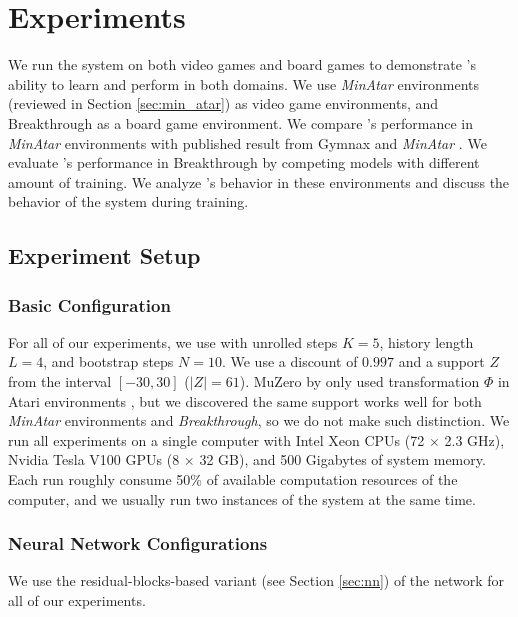 \chapter{Experiments}
\label{sec:exp}
We run the \moozi system on both video games and board games to demonstrate \moozi's ability to learn and perform in both domains.
We use \textit{MinAtar} environments (reviewed in Section \ref{sec:min_atar}) as video game environments, and Breakthrough as a board game environment.
We compare \moozi's performance in \textit{MinAtar} environments with published result from Gymnax \cite{GymnaxJAXbasedReinforcement_RobertTjarkoLange_2022} and \textit{MinAtar} \cite{MinAtarAtariInspiredTestbed_Young.Tian_2019}.
We evaluate \moozi's performance in Breakthrough by competing \moozi models with different amount of training.
We analyze \moozi's behavior in these environments and discuss the behavior of the system during training.

\section{Experiment Setup}
\subsection{Basic Configuration}
For all of our experiments, we use \moozi with unrolled steps $K = 5$, history length $L = 4$, and bootstrap steps $N = 10$.
We use a discount of $0.997$ and a support $Z$ from the interval  $[-30, 30]$ ($|Z| = 61$).
MuZero by \citeauthor{MasteringAtariGo_Schrittwieser.Antonoglou.ea_2020} only used transformation $\Phi$ in Atari environments \cite{MasteringAtariGo_Schrittwieser.Antonoglou.ea_2020}, but we discovered the same support works well for both \textit{MinAtar} environments and \textit{Breakthrough}, so we do not make such distinction.
We run all experiments on a single computer with Intel Xeon CPUs (72 $\times$ 2.3 GHz), Nvidia Tesla V100 GPUs (8 $\times$ 32 GB), and 500 Gigabytes of system memory.
Each run roughly consume 50\% of available computation resources of the computer, and we usually run two instances of the system at the same time.

\subsection{Neural Network Configurations}
We use the residual-blocks-based variant (see Section \ref{sec:nn}) of the network for all of our experiments.

